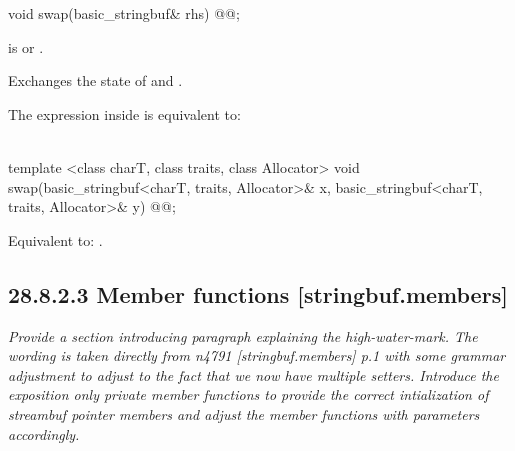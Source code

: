 \documentclass[ebook,11pt,article]{memoir}
\begin{document}
%
\begin{itemdecl}
void swap(basic_stringbuf& rhs) @@;
\end{itemdecl}

\begin{itemdescr}
\begin{addedblock}
\pnum
\expects {} is  or .
\end{addedblock}

\pnum
\effects Exchanges the state of 
and . 

\begin{addedblock}
\pnum
\remarks The expression inside  is equivalent to: \\
\\
\end{addedblock}
\end{itemdescr}

%
\begin{itemdecl}
template <class charT, class traits, class Allocator>
  void swap(basic_stringbuf<charT, traits, Allocator>& x,
            basic_stringbuf<charT, traits, Allocator>& y) @@;
\end{itemdecl}

\begin{itemdescr}
\pnum
\effects Equivalent to: .
\end{itemdescr}


\subsection{28.8.2.3 Member functions [stringbuf.members]}

\textit{Provide a section introducing paragraph explaining the high-water-mark. The wording is taken directly from n4791 [stringbuf.members] p.1 with some grammar adjustment to adjust to the fact that we now have multiple setters. Introduce the exposition only private member functions  to provide the correct intialization of streambuf pointer members and adjust the  member functions with parameters accordingly. }
\end{document}

